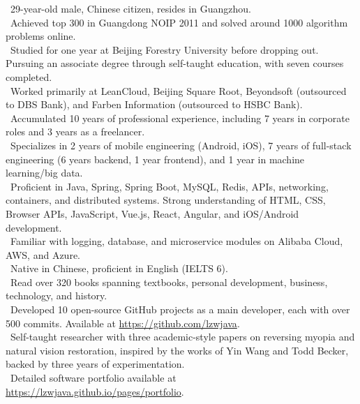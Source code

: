 


\begin{cvparagraph}
    \textbullet\ 29-year-old male, Chinese citizen, resides in Guangzhou. \\
    \textbullet\ Achieved top 300 in Guangdong NOIP 2011 and solved around 1000 algorithm problems online. \\
    \textbullet\ Studied for one year at Beijing Forestry University before dropping out. Pursuing an associate degree through self-taught education, with seven courses completed. \\
    \textbullet\ Worked primarily at LeanCloud, Beijing Square Root, Beyondsoft (outsourced to DBS Bank), and Farben Information (outsourced to HSBC Bank). \\
    \textbullet\ Accumulated 10 years of professional experience, including 7 years in corporate roles and 3 years as a freelancer. \\
    \textbullet\ Specializes in 2 years of mobile engineering (Android, iOS), 7 years of full-stack engineering (6 years backend, 1 year frontend), and 1 year in machine learning/big data. \\
    \textbullet\ Proficient in Java, Spring, Spring Boot, MySQL, Redis, APIs, networking, containers, and distributed systems. Strong understanding of HTML, CSS, Browser APIs, JavaScript, Vue.js, React, Angular, and iOS/Android development. \\
    \textbullet\ Familiar with logging, database, and microservice modules on Alibaba Cloud, AWS, and Azure. \\
    \textbullet\ Native in Chinese, proficient in English (IELTS 6). \\
    \textbullet\ Read over 320 books spanning textbooks, personal development, business, technology, and history. \\
    \textbullet\ Developed 10 open-source GitHub projects as a main developer, each with over 500 commits. Available at \href{https://github.com/lzwjava}{https://github.com/lzwjava}. \\
    \textbullet\ Self-taught researcher with three academic-style papers on reversing myopia and natural vision restoration, inspired by the works of Yin Wang and Todd Becker, backed by three years of experimentation. \\
    \textbullet\ Detailed software portfolio available at \href{https://lzwjava.github.io/pages/portfolio}{https://lzwjava.github.io/pages/portfolio}.
    \end{cvparagraph}

    
